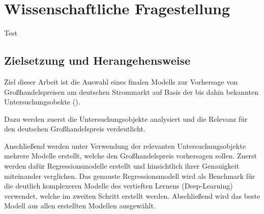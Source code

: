 \section{Wissenschaftliche Fragestellung}
Test 



\subsection{Zielsetzung und Herangehensweise}
Ziel dieser Arbeit ist die Auswahl eines finalen Modells zur Vorhersage von Großhandelspreisen am deutschen Strommarkt auf Basis der bis dahin bekannten Untersuchungsobekte ().

Dazu werden zuerst die Untersuchungsobjekte analysiert und die Relevanz für den deutschen Großhandelspreis verdeutlicht. 

Anschließend werden unter Verwendung der relevanten Untersuchungsobjekte mehrere Modelle erstellt, welche den Großhandelspreis vorhersagen sollen. Zuerst werden dafür Regressionsmodelle erstellt und hinsichtlich ihrer Genauigkeit miteinander verglichen. Das genauste Regressionsmodell wird als Benchmark für die deutlich komplexeren Modelle des vertieften Lernens (Deep-Learning) verwendet, welche im zweiten Schritt erstellt werden. Abschließend wird das beste Modell aus allen erstellten Modellen ausgewählt.



